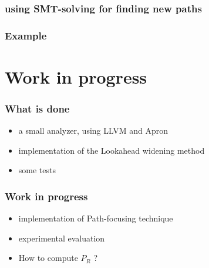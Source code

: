 \documentclass{beamer}
\begin{document}
\begin{frame}
  \frametitle{using SMT-solving for finding new paths}
\end{frame}

\begin{frame}
  \frametitle{Example}
\end{frame}


\section[Work in progress]{Work in progress}

\begin{frame}
  \frametitle{What is done}
\begin{itemize}
\item a small analyzer, using LLVM and Apron
\item implementation of the Lookahead widening method
\item some tests
\end{itemize}
\end{frame}

\begin{frame}
  \frametitle{Work in progress}
\begin{itemize}
\item implementation of Path-focusing technique
\item experimental evaluation
\item How to compute $P_R$ ?
\end{itemize}
\end{frame}
\end{document}
